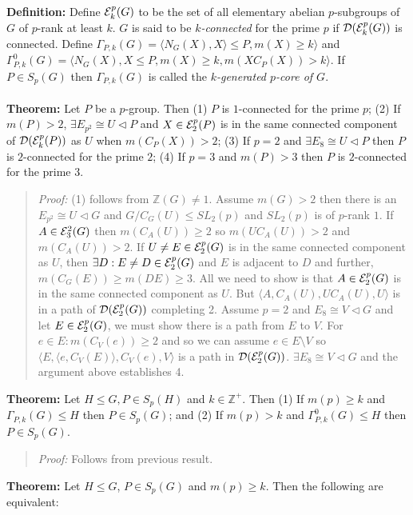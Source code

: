 {\bf Definition:}  
Define ${\cal E}_k^p(G)$ to be the set of all elementary abelian
$p$-subgroups of $G$ of $p$-rank at least $k$. $G$ is said to be $k$\emph{-connected}
for the prime $p$ if ${\cal D}({\cal E}_k^p(G))$ is connected.  
Define $\Gamma_{P,k}(G) = \langle N_G(X), X \rangle \le P, m(X) \ge k \rangle$ and
$\Gamma_{P,k}^0(G) = \langle N_G(X), X \le P, m(X) \ge k, m(XC_P(X)) > k \rangle$.  
If $P \in S_p(G)$ then
$\Gamma_{P,k}(G)$ is called the \emph{$k$-generated $p$-core of $G$}.
\\
\\
{\bf Theorem:} 
Let $P$ be a $p$-group.  Then 
(1) $P$ is $1$-connected for the prime $p$;
(2) If $m(P) > 2$, $\exists E_{p^2} \cong U \lhd P$ and $X \in {\cal E}_2^p(P)$ is in
the same connected component of ${\cal D}({\cal E}_k^p(P))$ as $U$ when
$m(C_P(X)) > 2$;
(3) If $p=2$ and $\exists E_{8} \cong U \lhd P$ then $P$ is $2$-connected for the prime $2$;
(4) If $p=3$ and $m(P) > 3$ then $P$ is $2$-connected for the prime $3$.
\begin{quote}
\emph{Proof:}  
(1) follows from ${\mathbb Z}(G) \ne 1$.  Assume $m(G) > 2$ then
there is an $E_{p^2} \cong  U \lhd G$ and $G/C_G(U) \le SL_2(p)$ and
$SL_2(p)$ is of $p$-rank $1$.  If $A \in {\cal E}^2_3(G)$ then 
$m(C_A(U) )  \ge 2$
so $m(UC_A(U)) > 2$ and
$m(C_A(U) ) > 2$.  If 
$U \ne E \in {\cal E}^p_2(G)$ is in the same connected component
as $U$, then
$\exists D: E \ne D \in {\cal E}^p_2(G)$ and $E$ is adjacent to $D$ and
further,  $m(C_G(E)) \ge m(DE) \ge 3$.  All we need to show is that
$A \in {\cal E}^p_2(G)$ is in the same connected component as $U$. 
But $\langle A, C_A(U), U C_A(U), U \rangle$ is in a path of
${\cal D}({\cal E}^p_2(G))$ completing 2.
Assume $p = 2$ and $E_8 \cong V \lhd G$ and let
$E \in {\cal E}^p_2(G)$, we must show there is a path from $E$ to $V$.
For $e \in E: m(C_V(e)) \ge 2$ and so we can assume $e \in E \setminus V$ so
$\langle E, \langle e, C_V(E) \rangle, C_V(e), V \rangle$ is a path in
${\cal D}({\cal E}^p_2(G))$.
$\exists E_8 \cong V \lhd G$
and the argument above establishes 4.
\end{quote}
{\bf Theorem:} 
Let $H \le G, P \in S_p(H)$ and $k \in {\mathbb Z}^+$.  Then
(1) If $m(p) \ge k$ and $\Gamma_{P,k}(G) \le H$ then $P \in S_p(G)$; and
(2) If $m(p) > k$ and $\Gamma_{P,k}^0(G) \le H$ then $P \in S_p(G)$.
\begin{quote}
\emph{Proof:}  
Follows from previous result.
\end{quote}
{\bf Theorem:} 
Let $H \le G$, $P \in S_p(G)$ and $m(p) \ge k$.  Then the following are equivalent:
